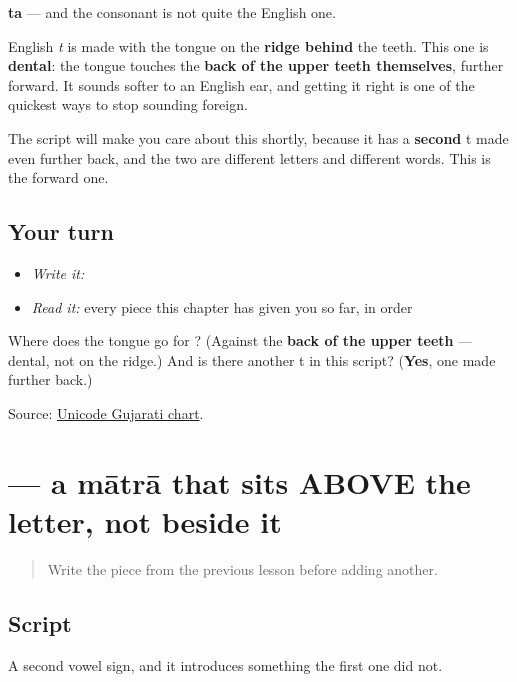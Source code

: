 \textbf{ta} — and the consonant is not quite the English one.

English \emph{t} is made with the tongue on the \textbf{ridge behind} the teeth. This one is \textbf{dental}: the tongue touches the \textbf{back of the upper teeth themselves}, further forward. It sounds softer to an English ear, and getting it right is one of the quickest ways to stop sounding foreign.

The script will make you care about this shortly, because it has a \textbf{second} t made even further back, and the two are different letters and different words. This is the forward one.

\subsection*{Your turn}
\begin{itemize}
\raggedright
  \item \emph{Write it:} 
  \item \emph{Read it:} every piece this chapter has given you so far, in order
\end{itemize}

\begin{tcolorbox}[breakable,colback=teal!4,colframe=teal!35!black,title={Before you move on}]
Where does the tongue go for \textbf{}? (Against the \textbf{back of the upper teeth} — dental, not on the ridge.) And is there another t in this script? (\textbf{Yes}, one made further back.)

Source: \href{https://www.unicode.org/charts/PDF/U0A80.pdf}{Unicode Gujarati chart}.
\end{tcolorbox}
\section[-e]{ — a mātrā that sits ABOVE the letter, not beside it}

\label{lesson:GU-W01-e-matra}



\begin{quote}
Write the piece from the previous lesson before adding another.
\end{quote}

\subsection*{Script}
A second vowel sign, and it introduces something the first one did not.

